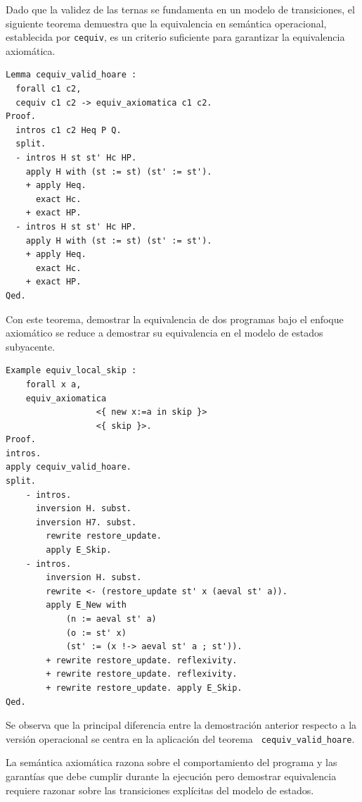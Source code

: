 Dado que la validez de las ternas se fundamenta en un modelo de transiciones, el siguiente teorema demuestra que la equivalencia en semántica operacional, establecida por \lstinline|cequiv|, es un criterio suficiente para garantizar la equivalencia axiomática.

\begin{lstlisting}[caption={Equivalencia bajo el modelo de estados para la semántica axiomática en Rocq}, basicstyle=\footnotesize \rmfamily
]
Lemma cequiv_valid_hoare :
  forall c1 c2,
  cequiv c1 c2 -> equiv_axiomatica c1 c2.
Proof.
  intros c1 c2 Heq P Q.
  split.
  - intros H st st' Hc HP.
    apply H with (st := st) (st' := st').
    + apply Heq.
      exact Hc.
    + exact HP.
  - intros H st st' Hc HP.
    apply H with (st := st) (st' := st').
    + apply Heq.
      exact Hc.
    + exact HP.
Qed.
\end{lstlisting}

Con este teorema, demostrar la equivalencia de dos programas bajo el enfoque axiomático se reduce a demostrar su equivalencia en el modelo de estados subyacente.

\begin{lstlisting}[caption={Programas equivalentes con semántica axiomática en Rocq}, basicstyle=\footnotesize \rmfamily
]
Example equiv_local_skip : 
    forall x a,
    equiv_axiomatica
                  <{ new x:=a in skip }>
                  <{ skip }>.
Proof.
intros.
apply cequiv_valid_hoare. 
split.
    - intros.
      inversion H. subst.
      inversion H7. subst.
        rewrite restore_update.
        apply E_Skip.
    - intros.
        inversion H. subst. 
        rewrite <- (restore_update st' x (aeval st' a)).
        apply E_New with
            (n := aeval st' a)
            (o := st' x)
            (st' := (x !-> aeval st' a ; st')).
        + rewrite restore_update. reflexivity.
        + rewrite restore_update. reflexivity.
        + rewrite restore_update. apply E_Skip.
Qed.
\end{lstlisting}

Se observa que la principal diferencia entre la demostración anterior respecto a la versión operacional  se centra en la aplicación  del teorema \lstinline| cequiv_valid_hoare|. 

La semántica axiomática razona sobre el comportamiento del programa y las garantías que debe cumplir durante la ejecución pero demostrar equivalencia requiere razonar sobre las transiciones explícitas del modelo de estados. 